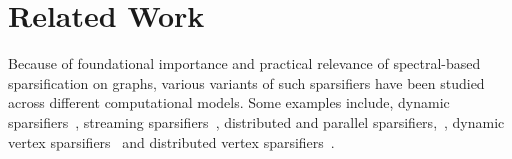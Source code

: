 \section{Related Work}
Because of foundational importance and practical relevance of spectral-based sparsification on graphs, various variants of such sparsifiers have been studied across different computational models. Some examples include, dynamic sparsifiers~\cite{Bernstein:2022aa}, streaming sparsifiers~\cite{Kelner:2013aa,Kapralov:2017aa,Kapralov:2019aa}, distributed and parallel sparsifiers,~\cite{Koutis:2016aa}, dynamic vertex sparsifiers~\cite{Goranci:2018aa,Durfee:2019aa,Chen:2020ac,Gao:2021aa,Axiotis:2021aa,Brand:2022aa,Dong:2022aa} and distributed vertex sparsifiers~\cite{Zhu:2021aa,Forster:2021aa}.